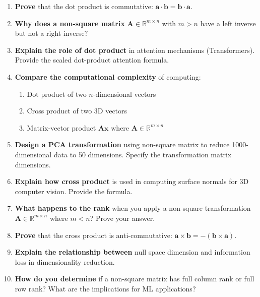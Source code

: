 \documentclass[12pt,a4paper]{article}
\theoremstyle{definition}
\begin{document}
\begin{enumerate}[resume]
\item \textbf{Prove} that the dot product is commutative: $\mathbf{a} \cdot \mathbf{b} = \mathbf{b} \cdot \mathbf{a}$.

\item \textbf{Why does a non-square matrix} $\mathbf{A} \in \mathbb{R}^{m \times n}$ with $m > n$ have a left inverse but not a right inverse?

\item \textbf{Explain the role of dot product} in attention mechanisms (Transformers). Provide the scaled dot-product attention formula.

\item \textbf{Compare the computational complexity} of computing:
\begin{enumerate}[label=(\alph*)]
\item Dot product of two $n$-dimensional vectors
\item Cross product of two 3D vectors
\item Matrix-vector product $\mathbf{A}\mathbf{x}$ where $\mathbf{A} \in \mathbb{R}^{m \times n}$
\end{enumerate}

\item \textbf{Design a PCA transformation} using non-square matrix to reduce 1000-dimensional data to 50 dimensions. Specify the transformation matrix dimensions.

\item \textbf{Explain how cross product} is used in computing surface normals for 3D computer vision. Provide the formula.

\item \textbf{What happens to the rank} when you apply a non-square transformation $\mathbf{A} \in \mathbb{R}^{m \times n}$ where $m < n$? Prove your answer.

\item \textbf{Prove} that the cross product is anti-commutative: $\mathbf{a} \times \mathbf{b} = -(\mathbf{b} \times \mathbf{a})$.

\item \textbf{Explain the relationship between} null space dimension and information loss in dimensionality reduction.

\item \textbf{How do you determine} if a non-square matrix has full column rank or full row rank? What are the implications for ML applications?
\end{enumerate}
\end{document}

